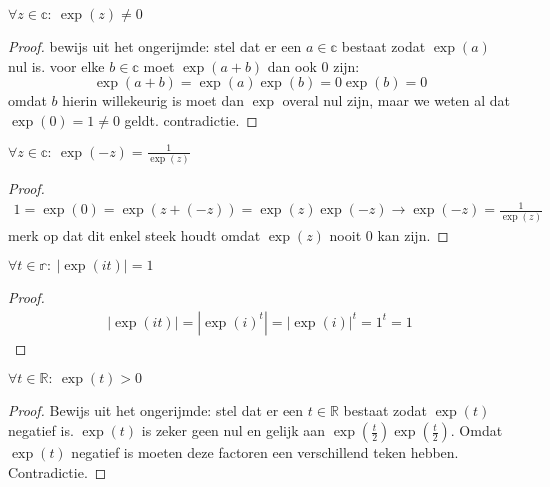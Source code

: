 \documentclass[main.tex]{subfiles}
\begin{document}
\begin{bpr}
  \label{pr:exp-nooit-nul}
  $\forall z \in \mathbb{c}:\ \exp(z) \neq 0$

  \begin{proof}
    bewijs uit het ongerijmde: stel dat er een $a\in \mathbb{c}$ bestaat zodat $\exp(a)$ nul is.
    voor elke $b\in \mathbb{c}$ moet $\exp(a+b)$ dan ook $0$ zijn:
    \[ \exp(a+b) = \exp(a)\exp(b) = 0\exp(b) = 0 \]
    omdat $b$ hierin willekeurig is moet dan $\exp$ overal nul zijn, maar we weten al dat $\exp(0) = 1 \neq 0$ geldt.
    contradictie.
  \end{proof}
\end{bpr}
\feed 

\begin{bpr}
  \label{pr:inverse-exponent}
  $\forall z \in \mathbb{c}:\ \exp(-z) = \frac{1}{\exp(z)}$

  \begin{proof}
    \begin{align*}
      1 = \exp(0)
      = \exp(z+(-z))
      = \exp(z)\exp(-z)
      \rightarrow
      \exp(-z)
      = \frac{1}{\exp(z)}
    \end{align*}
    merk op dat dit enkel steek houdt omdat $\exp(z)$ nooit $0$ kan zijn.
  \end{proof}
\end{bpr}

\begin{bpr}
  \label{pr:lengte-imaginaire-exponentiatie-1}
  $\forall t \in \mathbb{r}:\ |\exp(it)| = 1$

  \begin{proof}
    \begin{align*}
      |\exp(it)|
      = \left|\exp(i)^{t}\right|
      = \left|\exp(i)\right|^{t}
      = 1^{t}
      = 1
    \end{align*}
  \end{proof}
\end{bpr}

\begin{bpr}
  \label{pr:reele-exponentiatie-positief}
  $\forall t \in \mathbb{R}:\ \exp(t) > 0$

  \begin{proof}
    Bewijs uit het ongerijmde: stel dat er een $t\in \mathbb{R}$ bestaat zodat $\exp(t)$ negatief is.
    $\exp(t)$ is zeker geen nul en gelijk aan $\exp\left(\frac{t}{2}\right)\exp\left(\frac{t}{2}\right)$.
    Omdat $\exp(t)$ negatief is moeten deze factoren een verschillend teken hebben.
    Contradictie.
  \end{proof}
\end{bpr}
  \feed
\end{document}
